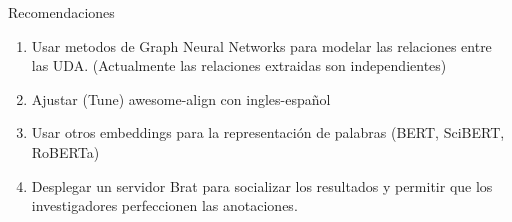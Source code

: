 \begin{recomendations}
    Recomendaciones

    \begin{enumerate}
        \item Usar metodos de Graph Neural Networks para modelar las relaciones entre las UDA. (Actualmente las relaciones extraidas son independientes)
        \item Ajustar (Tune) awesome-align con ingles-español
        \item Usar otros embeddings para la representación de palabras (BERT, SciBERT, RoBERTa)
        \item Desplegar un servidor Brat para socializar los resultados y permitir que los investigadores perfeccionen las anotaciones.
    \end{enumerate}
\end{recomendations}
